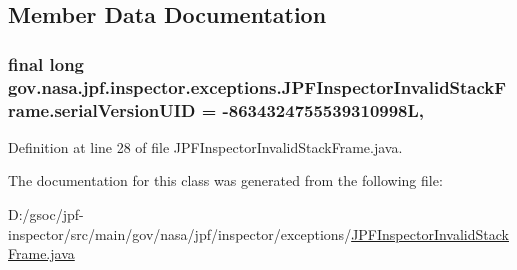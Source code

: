 \subsection{Member Data Documentation}
\subsubsection[{\texorpdfstring{serial\+Version\+U\+ID}{serialVersionUID}}]{\setlength{\rightskip}{0pt plus 5cm}final long gov.\+nasa.\+jpf.\+inspector.\+exceptions.\+J\+P\+F\+Inspector\+Invalid\+Stack\+Frame.\+serial\+Version\+U\+ID = -\/8634324755539310998L\hspace{0.3cm}{\ttfamily [static]}, {\ttfamily [private]}}\hypertarget{classgov_1_1nasa_1_1jpf_1_1inspector_1_1exceptions_1_1_j_p_f_inspector_invalid_stack_frame_af4c610c4ef5786c27cc17c25f0e0cba3}{}\label{classgov_1_1nasa_1_1jpf_1_1inspector_1_1exceptions_1_1_j_p_f_inspector_invalid_stack_frame_af4c610c4ef5786c27cc17c25f0e0cba3}


Definition at line 28 of file J\+P\+F\+Inspector\+Invalid\+Stack\+Frame.\+java.



The documentation for this class was generated from the following file\+:\begin{DoxyCompactItemize}
\item 
D\+:/gsoc/jpf-\/inspector/src/main/gov/nasa/jpf/inspector/exceptions/\hyperlink{_j_p_f_inspector_invalid_stack_frame_8java}{J\+P\+F\+Inspector\+Invalid\+Stack\+Frame.\+java}\end{DoxyCompactItemize}
